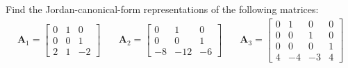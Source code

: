 \item Find the Jordan-canonical-form
representations of the following matrices:
\begin{align*}
\mathbf{A}_1 = \begin{bmatrix}
        0 & 1 & 0\\
        0 & 0 & 1\\
        2 & 1 & -2
       \end{bmatrix}
& \quad
\mathbf{A}_2 = \begin{bmatrix}
        0 & 1 & 0\\
        0 & 0 & 1\\
        -8 & -12 & -6
       \end{bmatrix}
& \quad
\mathbf{A}_3 = \begin{bmatrix}
        0 & 1 & 0 & 0 \\
        0 & 0 & 1 & 0 \\
        0 & 0 & 0 & 1 \\
        4 & -4 & -3 & 4
       \end{bmatrix}
\end{align*}


